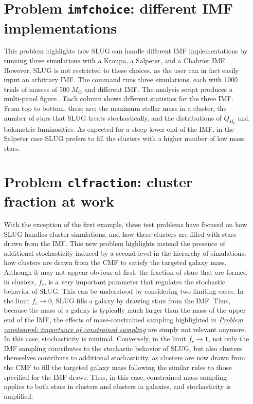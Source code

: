 \documentclass[letterpaper,10pt,english]{sphinxmanual}
\begin{document}
\section{Problem \texttt{imfchoice}: different IMF implementations}
\label{tests:problem-imfchoice-different-imf-implementations}\label{tests:probimf-label}
This problem highlights how SLUG can handle different IMF implementations by running
three simulations with a Kroupa, a Salpeter, and a Chabrier IMF. However, SLUG is not
restricted to these choices, as the user can in fact easily input an arbitrary IMF.
The command   runs three  simulations, each with 1000 trials
of masses of \(500\;M_\odot\) and different IMF. The analysis script
 produces a multi-panel figure .
Each column shows different statistics for the three IMF. From top to bottom, these are:
the maximum stellar mass in a cluster, the number of stars that SLUG treats stochastically,
and the distributions of \(Q_{H_0}\)  and bolometric luminosities.
As expected for a steep lower-end of the IMF, in the Salpeter case SLUG prefers to fill the
clusters with a higher number of low mass stars.


\section{Problem \texttt{clfraction}: cluster fraction at work}
\label{tests:problem-clfraction-cluster-fraction-at-work}
With the exception of the first example, these test problems have focused on how SLUG handles
cluster simulations, and how these clusters are filled with stars drawn from the IMF.
This new problem highlights instead the presence of additional stochasticity induced by a
second level in the hierarchy of  simulations: how clusters are drawn from the CMF to satisfy the
targeted galaxy mass. Although it may not appear obvious at first,
the fraction of stars that are formed in clusters, \(f_c\), is a very important parameter that regulates
the stochastic behavior of SLUG. This can be understood by considering two limiting cases.
In the limit \(f_c \rightarrow 0\), SLUG fills a galaxy by drawing stars from the
IMF. Thus, because the mass of a galaxy is typically much larger than the mass of the upper
end of the IMF, the effects of mass-constrained sampling highlighted in {\hyperref[tests:probsampl\string-label]{\emph{Problem constsampl: importance of constrained sampling}}} are simply
not relevant anymore. In this case, stochasticity is minimal.
Conversely, in the limit \(f_c \rightarrow 1\), not only the IMF sampling contributes to the
stochastic behavior of SLUG, but also clusters themselves contribute to additional stochasticity,
as clusters are now drawn from the CMF to fill the targeted galaxy mass following the similar rules
to those specified for the IMF draws. Thus, in this case, constrained mass sampling applies to both
stars in clusters and clusters in galaxies, and stochasticity is amplified.
\end{document}
